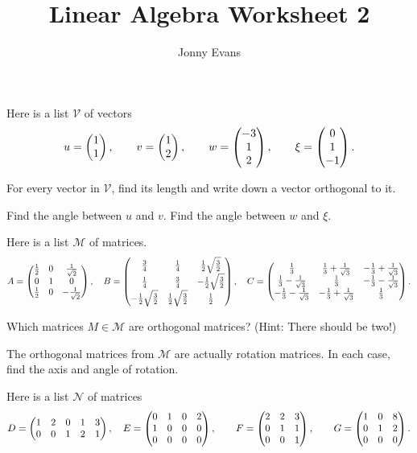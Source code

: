 \documentclass{article}
\title{Linear Algebra Worksheet 2}
\author{Jonny Evans}
\date{}
\begin{document}
\maketitle
\setcounter{section}{2}


Here is a list \(\mathcal{V}\) of vectors \[u=\begin{pmatrix} 1 \\ 1 \end{pmatrix},\qquad
v=\begin{pmatrix} 1 \\ 2\end{pmatrix},\qquad w=\begin{pmatrix} -3 \\ 1 \\ 2\end{pmatrix},\qquad \xi=\begin{pmatrix} 0 \\ 1
\\ -1\end{pmatrix}.\]


\begin{Exercise}\label{exr:orth}
For every vector in \(\mathcal{V}\), find its length and write down
a vector orthogonal to it.


\end{Exercise}
\begin{Exercise}\label{ex:dotprods}
Find the angle between \(u\) and \(v\). Find the angle between \(w\)
and \(\xi\).


\end{Exercise}
Here is a list \(\mathcal{M}\) of matrices. \[A=\begin{pmatrix} \frac{1}{2} & 0 &
\frac{1}{\sqrt{2}} \\ 0 & 1 & 0 \\ \frac{1}{2} & 0 &
-\frac{1}{\sqrt{2}}\end{pmatrix},\quad B=\begin{pmatrix} \frac{3}{4} & \frac{1}{4} &
\frac{1}{2}\sqrt{\frac{3}{2}} \\ \frac{1}{4} & \frac{3}{4} &
-\frac{1}{2}\sqrt{\frac{3}{2}} \\ -\frac{1}{2}\sqrt{\frac{3}{2}} &
\frac{1}{2}\sqrt{\frac{3}{2}} & \frac{1}{2} \end{pmatrix},\quad C=\begin{pmatrix}
\frac{1}{3} & \frac{1}{3}+\frac{1}{\sqrt{3}} &
-\frac{1}{3}+\frac{1}{\sqrt{3}} \\ \frac{1}{3}-\frac{1}{\sqrt{3}} &
\frac{1}{3} &
-\frac{1}{3}-\frac{1}{\sqrt{3}}\\ -\frac{1}{3}-\frac{1}{\sqrt{3}} &
-\frac{1}{3}+\frac{1}{\sqrt{3}} & \frac{1}{3} \end{pmatrix}.\]


\begin{Exercise}\label{exr:orthogmat}
Which matrices \(M\in\mathcal{M}\) are orthogonal matrices? (Hint:
There should be two!)


\end{Exercise}
\begin{Exercise}\label{exr:3drot}
The orthogonal matrices from \(\mathcal{M}\) are actually rotation
matrices. In each case, find the axis and angle of rotation.


\end{Exercise}
Here is a list \(\mathcal{N}\) of matrices
\[D=\begin{pmatrix} 1 & 2 & 0 & 1 & 3 \\ 0 & 0 & 1 & 2 & 1\end{pmatrix},\quad E=\begin{pmatrix} 0 & 1 & 0
& 2 \\ 1 & 0 & 0 & 0 \\ 0 & 0 & 0 & 0\end{pmatrix},\qquad F=\begin{pmatrix} 2 & 2 & 3 \\ 0 & 1
& 1 \\ 0 & 0 & 1\end{pmatrix},\qquad G=\begin{pmatrix} 1 & 0 & 8 \\ 0 & 1 & 2 \\ 0 & 0 & 0\end{pmatrix}.\]
\end{document}
